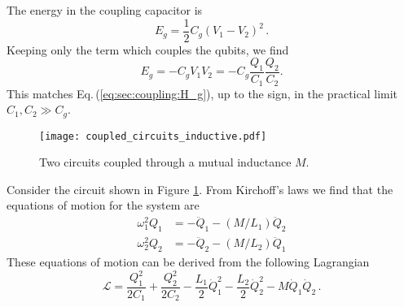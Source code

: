 
The energy in the coupling capacitor is
\begin{equation}
E_g = \frac{1}{2} C_g \left( V_1 - V_2 \right)^2 \, . \nonumber
\end{equation}
Keeping only the term which couples the qubits, we find \begin{equation}
E_g = -C_g V_1 V_2 = -C_g \frac{Q_1}{C_1} \frac{Q_2}{C_2} . \end{equation}
This matches Eq.\,(\ref{eq:sec:coupling:H_g}), up to the sign, in the practical limit $C_1,C_2 \gg C_g$.


\begin{figure}
\begin{centering}
\texttt{[image: coupled\_circuits\_inductive.pdf]}
\par\end{centering}
\caption{Two circuits coupled through a mutual inductance $M$.}
\label{Fig:coupledCircuits_inductive}
\end{figure}


Consider the circuit shown in Figure \ref{Fig:coupledCircuits_inductive}.
From Kirchoff's laws we find that the equations of motion for the system are
\begin{align}
\omega_1^2 Q_1 &= -\ddot{Q}_1 - \left(M/L_1\right) \ddot{Q}_2 \\
\omega_2^2 Q_2 &= -\ddot{Q}_2 - \left(M/L_2\right) \ddot{Q}_1
\end{align}
These equations of motion can be derived from the following Lagrangian
\begin{equation}
\mathcal{L} = \frac{Q_1^2}{2 C_1} + \frac{Q_2^2}{2 C_2}
- \frac{L_1}{2}\dot{Q}_1^2
- \frac{L_2}{2}\dot{Q}_2^2
- M \dot{Q}_1 \dot{Q}_2 \, . \label{eq:sec.coupling.subsec.inductiveCoupling:Lagrangian}
\end{equation}

